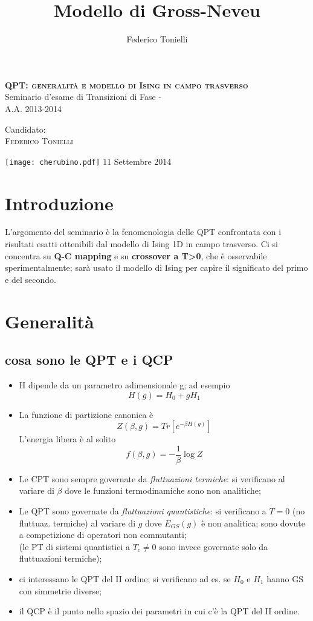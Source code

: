 \documentclass[a4paper,11pt]{article}
\title{Modello di Gross-Neveu}
\author{Federico Tonielli}
\newcommand\blankpage{%
    \null
    \thispagestyle{empty}%
    \addtocounter{page}{-1}%
    \newpage}
\newcommand{\ssection}[2]{\vspace{0.5 cm} \section{ \texorpdfstring{\textbf{#1}}{#2} }}
\newcommand{\ssubsection}[1]{\vspace{0.2cm} \subsection{#1}}
\begin{document}
\begin{titlepage}
  \begin{center}
  \textsc{ \LARGE \textbf{QPT: generalità e modello di Ising in campo trasverso}  } \\[1 cm]
  \Large{Seminario d'esame di Transizioni di Fase - \\
  A.A. 2013-2014}
  \vspace{0.5 cm}
  \\[1.5 cm]
  \begin{flushright} 
  \Large 
  Candidato:\\
  \textsc{Federico Tonielli}
  \end{flushright}
  \vspace{2.5 cm}
  \texttt{[image: cherubino.pdf]}
  \vfill
  {\Large 11 Settembre 2014}
  \end{center}  
\end{titlepage}

\blankpage

\tableofcontents
\blankpage

\ssection{Introduzione}{Introduzione}
L'argomento del seminario è la fenomenologia delle QPT confrontata con i risultati esatti ottenibili dal modello di Ising 1D in campo trasverso. Ci si concentra su \textbf{Q-C mapping} e su \textbf{crossover a T>0}, che è osservabile sperimentalmente; sarà usato il modello di Ising per capire il significato del primo e del secondo.

\ssection{Generalità}{Generalità}

\ssubsection{cosa sono le QPT e i QCP}
\begin{itemize}
 \item H dipende da un parametro adimensionale g; ad esempio \[ H(g) = H_0 + g H_1\]
 \item La funzione di partizione canonica è \[ Z(\beta,g) = Tr\left[ e^{-\beta H(g)}\right] \] L'energia libera è al solito 
 	\[ f(\beta,g) = -\frac{1}{\beta}\log Z \]
 \item Le CPT sono sempre governate da \emph{fluttuazioni termiche}: si verificano al variare di $\beta$ dove le funzioni termodinamiche sono non analitiche; 
 \item Le QPT sono governate da \emph{fluttuazioni quantistiche}: si verificano a $T=0$ (no fluttuaz. termiche) al variare di $g$ dove $E_{GS}(g)$ è non analitica; sono dovute a competizione di operatori non commutanti; \\ (le PT di sistemi quantistici a $T_c \neq 0$ sono invece governate solo da fluttuazioni termiche);
 \item ci interessano le QPT del II ordine; si verificano ad es. se $H_0$ e $H_1$ hanno GS con simmetrie diverse;
 \item il QCP è il punto nello spazio dei parametri in cui c'è la QPT del II ordine.
\end{itemize}
\end{document}
